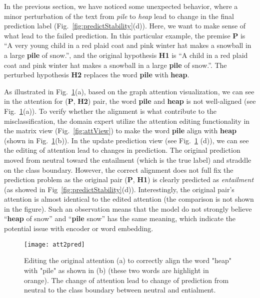 In the previous section, we have noticed some unexpected behavior, where a minor perturbation of the text from \emph{pile} to \emph{heap} lead to change in the final prediction label (Fig.~\ref{fig:predictStability}(d)). Here, we want to make sense of what lead to the failed prediction. In this particular example, the premise \textbf{P} is ``A very young child in a red plaid coat and pink winter hat makes a snowball in a large \textbf{pile} of snow.'', and the original hypothesis \textbf{H1} is ``A child in a red plaid coat and pink winter hat makes a snowball in a large \textbf{pile} of snow.''. The perturbed hypothesis \textbf{H2} replaces the word \textbf{pile} with \textbf{heap}.

As illustrated in Fig.~\ref{fig:att2pred}(a), based on the graph attention visualization, we can see in the attention for (\textbf{P}, \textbf{H2}) pair, the word \textbf{pile} and \textbf{heap} is not well-aligned (see Fig.~\ref{fig:att2pred}(a)). 
%
To verify whether the alignment is what contribute to the misclassification, the domain expert utilize the attention editing functionality in the matrix view (Fig.~\ref{fig:attView}) to make the word \textbf{pile} align with \textbf{heap} (shown in Fig.~\ref{fig:att2pred}(b)). 
%
In the update prediction view (see Fig.~\ref{fig:att2pred} (d)), we can see the editing of attention lead to changes in prediction. The original prediction moved from neutral toward the entailment (which is the true label) and straddle on the class boundary. However, the correct alignment does not full fix the prediction problem as the original pair (\textbf{P}, \textbf{H1}) is clearly predicted as \emph{entailment} (as showed in Fig~\ref{fig:predictStability}(d)). 
%
Interestingly, the original pair's attention is almost identical to the edited attention (the comparison is not shown in the figure). Such an observation means that the model do not strongly believe ``\textbf{heap} of snow'' and ``\textbf{pile} snow'' has the same meaning, which indicate the potential issue with encoder or word embedding.

\begin{figure}[htbp]
\centering
\vspace{-2mm}
 \texttt{[image: att2pred]}
 \caption{
Editing the original attention (a) to correctly align the word "heap" with "pile" as shown in (b) (these two words are highlight in orange).  
The change of attention lead to change of prediction from neutral to the class boundary between neutral and entialment.
%
}
\label{fig:att2pred}
\end{figure}

